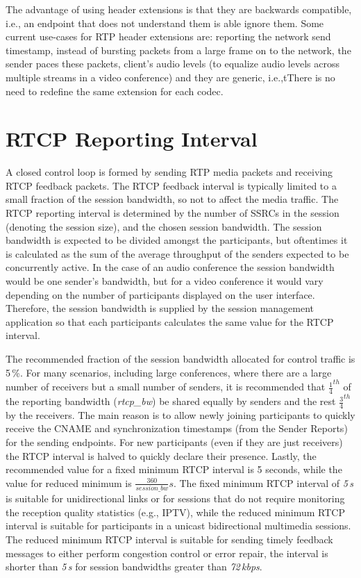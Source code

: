 The advantage of using header extensions is that they are backwards
compatible, i.e., an endpoint that does not understand them is able ignore
them. Some current use-cases for RTP header extensions are: reporting the
network send timestamp, instead of bursting packets from a large frame on to
the network, the sender paces these packets, client's audio levels (to
equalize audio levels across multiple streams in a video conference) and they
are generic, i.e.,tThere is no need to redefine the same extension for each
codec.

\section{RTCP Reporting Interval}

A closed control loop is formed by sending RTP media packets and receiving
RTCP feedback packets. The RTCP feedback interval is typically limited to a
small fraction of the session bandwidth, so not to affect the media traffic.
The RTCP reporting interval is determined by the number of SSRCs in the
session (denoting the session size), and the chosen session bandwidth. The
session bandwidth is expected to be divided amongst the participants, but
oftentimes it is calculated as the sum of the average throughput of the
senders expected to be concurrently active. In the case of an audio conference
the session bandwidth would be one sender's bandwidth, but for a video
conference it would vary depending on the number of participants displayed on
the user interface. Therefore, the session bandwidth is supplied by the
session management application so that each participants calculates the same
value for the RTCP interval.


The recommended fraction of the session bandwidth allocated for control
traffic is 5\,\%. For many scenarios, including large conferences, where there
are a large number of receivers but a small number of senders, it is
recommended that $\frac{1}{4}^{th}$ of the reporting bandwidth
(\emph{rtcp\_bw}) be shared equally by senders and the rest $\frac{3}{4}^{th}$
by the receivers. The main reason is to allow newly joining participants to
quickly receive the CNAME and synchronization timestamps (from the Sender
Reports) for the sending endpoints. For new participants (even if they are
just receivers) the RTCP interval is halved to quickly declare their presence. 
Lastly, the recommended value for a fixed minimum RTCP
interval is 5 seconds, while the value for reduced minimum is
$\frac{360}{session\_bw}s$.  The fixed minimum RTCP interval of \emph{5\,s} is
suitable for unidirectional links or for sessions that do not require
monitoring the reception quality statistics (e.g., IPTV), while the reduced
minimum RTCP interval is suitable for participants in a unicast bidirectional
multimedia sessions. The reduced minimum RTCP interval is suitable for sending
timely feedback messages to either perform congestion control or error repair,
the interval is shorter than \emph{5\,s} for session bandwidths greater than
\emph{72\,kbps}.

